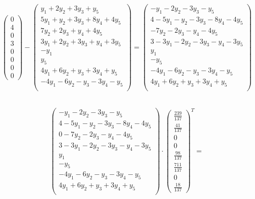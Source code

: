 \documentclass{article}
\begin{document}
\begin{equation*}
    \begin{pmatrix}
    0 \\ 4 \\ 0 \\ 3 \\ 0 \\ 0 \\ 0 \\ 0
    \end{pmatrix}
    -
    \begin{pmatrix}
    y_1+2y_2+3y_3+y_5 \\ 5y_1+y_2+3y_3+8y_4+4y_5 \\ 7y_2+2y_3+y_4+4y_5 \\ 3y_1+2y_2+3y_3+y_4+3y_5 \\ -y_1 \\ y_5 \\ 4y_1+6y_2+y_3+3y_4+y_5 \\ -4y_1-6y_2-y_3-3y_4-y_5\\
    \end{pmatrix}
    =
    \begin{pmatrix}
    -y_1-2y_2-3y_3-y_5 \\ 4-5y_1-y_2-3y_3-8y_4-4y_5 \\ -7y_2-2y_3-y_4-4y_5 \\ 3-3y_1-2y_2-3y_3-y_4-3y_5 \\ y_1 \\ -y_5 \\ -4y_1-6y_2-y_3-3y_4-y_5 \\ 4y_1+6y_2+y_3+3y_4+y_5\\
    \end{pmatrix}
\end{equation*}
~

\begin{equation*}
     \begin{pmatrix}
    -y_1-2y_2-3y_3-y_5 \\ 4-5y_1-y_2-3y_3-8y_4-4y_5 \\ 0-7y_2-2y_3-y_4-4y_5 \\ 3-3y_1-2y_2-3y_3-y_4-3y_5 \\ y_1 \\ -y_5 \\ -4y_1-6y_2-y_3-3y_4-y_5 \\ 4y_1+6y_2+y_3+3y_4+y_5\\
    \end{pmatrix}
    \cdot
    \begin{pmatrix}
    \frac{239}{137} \\ \frac{41}{137} \\0\\0\\\frac{98}{137}\\\frac{711}{137}\\0\\\frac{18}{137}
    \end{pmatrix}^T
   =
\end{equation*}
~
\end{document}

